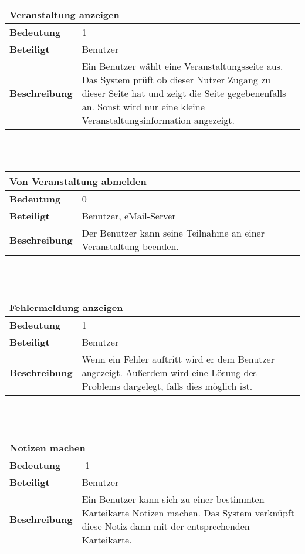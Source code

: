 \documentclass[12pt,a4paper]{article}
\begin{document}
\begin{tabular}{l p{10cm}}
\multicolumn{2}{l}{\textbf{Veranstaltung anzeigen}} \\ \hline
\textbf{Bedeutung} & 1 \\ \hline 
\textbf{Beteiligt} & Benutzer \\ \hline 
\textbf{Beschreibung} & Ein Benutzer wählt eine Veranstaltungsseite aus. Das System prüft ob dieser Nutzer Zugang zu dieser Seite hat und zeigt die Seite gegebenenfalls an. Sonst wird nur eine kleine Veranstaltungsinformation angezeigt. \\ 
\hline 
\end{tabular}\\\\

\begin{tabular}{l p{10cm}}
\multicolumn{2}{l}{\textbf{Von Veranstaltung abmelden}} \\ \hline
\textbf{Bedeutung} & 0 \\ \hline 
\textbf{Beteiligt} & Benutzer, eMail-Server \\ \hline 
\textbf{Beschreibung} & Der Benutzer kann seine Teilnahme an einer Veranstaltung beenden. \\ 
\hline 
\end{tabular}\\\\

\begin{tabular}{l p{10cm}}
\multicolumn{2}{l}{\textbf{Fehlermeldung anzeigen}} \\ \hline
\textbf{Bedeutung} & 1 \\ \hline 
\textbf{Beteiligt} & Benutzer \\ \hline 
\textbf{Beschreibung} & Wenn ein Fehler auftritt wird er dem Benutzer angezeigt. Außerdem wird eine Lösung des Problems dargelegt, falls dies möglich ist. \\ 
\hline 
\end{tabular}\\\\

\begin{tabular}{l p{10cm}}
\multicolumn{2}{l}{\textbf{Notizen machen}} \\ \hline
\textbf{Bedeutung} & -1 \\ \hline 
\textbf{Beteiligt} & Benutzer \\ \hline 
\textbf{Beschreibung} & Ein Benutzer kann sich zu einer bestimmten Karteikarte Notizen machen. Das System verknüpft diese Notiz dann mit der entsprechenden Karteikarte. \\ 
\hline 
\end{tabular}\\\\
\end{document}
